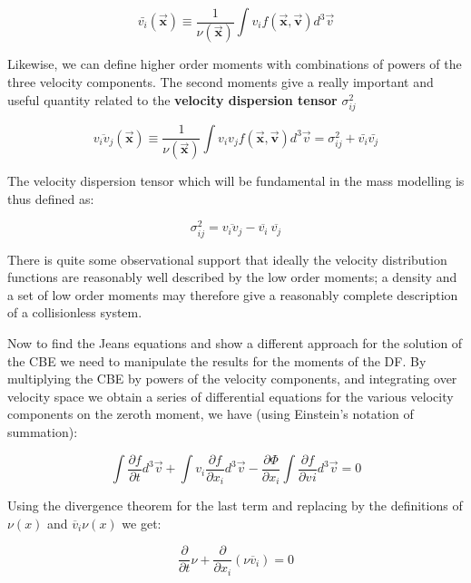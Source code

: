 \begin{equation}
\bar{v_{i}}(\vec{\textbf{x}})\equiv \frac{1}{\nu(\vec{\textbf{x}})}\int v_{i}f(\vec{\textbf{x}},\vec{\textbf{v}})d^{3}\vec{v}
\end{equation}

Likewise, we can define higher order moments with combinations of powers of the three velocity components. The second moments give a really important and useful quantity related to the \textbf{velocity dispersion tensor} $\sigma^{2}_{ij}$

\begin{equation}
\overline{v_{i}v_{j}}(\vec{\textbf{x}})\equiv \frac{1}{\nu(\vec{\textbf{x}})}\int v_{i}v_{j}f(\vec{\textbf{x}},\vec{\textbf{v}})d^{3}\vec{v}=\sigma^{2}
_{ij}+\bar{v_{i}}\bar{v_{j}}
\end{equation}

The velocity dispersion tensor which will be fundamental in the mass modelling is thus defined as:

\begin{equation}
\sigma_{ij}^{2}=\overline{v_{i}v_{j}}-\overline{v_{i}}\:\overline{v_{j}}
\end{equation}

There is quite some observational support that ideally the velocity distribution functions are reasonably well described by the low order moments; a density and a set of low order moments may therefore give a reasonably complete description of a collisionless system. 

Now to find the Jeans equations and show a different approach for the solution of the CBE we need to manipulate the results for the moments of the DF. By multiplying the CBE by powers of the velocity components, and integrating over velocity space we obtain a series of differential equations for the various velocity components on the zeroth moment, we have (using Einstein's notation of summation):

\begin{equation}
\int \frac{\partial f}{\partial t}d^{3}\vec{v}+ \int v_{i}\frac{\partial f}{\partial x_{i}} d^{3}\vec{v}- \frac{\partial\Phi}{\partial x_{i}}\int \frac{\partial f}{\partial v_{}i} d^{3}\vec{v}= 0
\end{equation}

Using the divergence theorem for the last term and replacing by the definitions of $\nu(x)$ and $\overline{v}_{i}\nu(x)$ we get:

\begin{equation}
\frac{\partial}{\partial t}\nu+\frac{\partial}{\partial x_{i}}(\nu \overline{v}_{i})=0
\end{equation}

